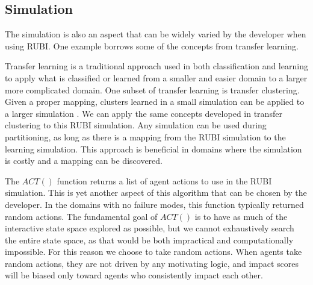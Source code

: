 \documentclass[letterpaper]{article}
\begin{document}

\subsection{Simulation}
The simulation is also an aspect that can be widely varied by the developer when using RUBI. One example borrows some of the concepts from transfer learning.

Transfer learning is a traditional approach used in both classification and learning to apply what is classified or learned from a smaller and easier domain to a larger more complicated domain. One subset of transfer learning is transfer clustering. Given a proper mapping, clusters learned in a small simulation can be applied to a larger simulation \cite{6378284}. We can apply the same concepts developed in transfer clustering to this RUBI simulation. Any simulation can be used during partitioning, as long as there is a mapping from the RUBI simulation to the learning simulation. This approach is beneficial in domains where the simulation is costly and a mapping can be discovered. 

The $ACT()$ function returns a list of agent actions to use in the RUBI simulation. This is yet another aspect of this algorithm that can be chosen by the developer. In the domains with no failure modes, this function typically returned random actions. The fundamental goal of $ACT()$ is to have as much of the interactive state space explored as possible, but we cannot exhaustively search the entire state space, as that would be both impractical and computationally impossible. For this reason we choose to take random actions. When agents take random actions, they are not driven by any motivating logic, and impact scores will be biased only toward agents who consistently impact each other. 

\end{document}
